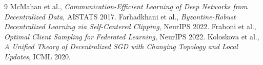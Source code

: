 \documentclass[10pt,letterpaper]{article}
\begin{document}
\vspace{4pt}
\begin{thebibliography}{9}
\small
\setlength{\itemsep}{0pt}
 McMahan et al., \textit{Communication-Efficient Learning of Deep Networks from Decentralized Data}, AISTATS 2017.
 Farhadkhani et al., \textit{Byzantine-Robust Decentralized Learning via Self-Centered Clipping}, NeurIPS 2022.
 Fraboni et al., \textit{Optimal Client Sampling for Federated Learning}, NeurIPS 2022.
 Koloskova et al., \textit{A Unified Theory of Decentralized SGD with Changing Topology and Local Updates}, ICML 2020.
\end{thebibliography}
\end{document}
